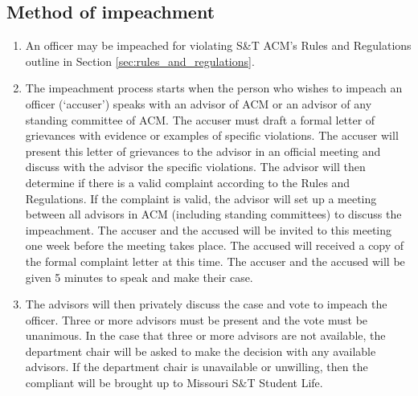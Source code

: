 \subsection{Method of impeachment}\label{sec:officers:impeachment}
\begin{enumerate}[label=\arabic*.]
  \item An officer may be impeached for violating S\&T ACM's Rules and
    Regulations outline in Section \ref{sec:rules_and_regulations}.
  \item The impeachment process starts when the person who wishes to impeach
    an officer (`accuser') speaks with an advisor of ACM or an advisor of
    any standing committee of ACM. The accuser must draft a formal letter of
    grievances with evidence or examples of specific violations. The accuser will
    present this letter of grievances to the advisor in an official meeting
    and discuss with the advisor the specific violations. The advisor will
    then determine if there is a valid complaint according to the Rules and
    Regulations. If the complaint is valid, the advisor will set up a
    meeting between all advisors in ACM (including standing committees) to
    discuss the impeachment. The accuser and the accused will be invited to
    this meeting one week before the meeting takes place. The accused will
    received a copy of the formal complaint letter at this time. The accuser and
    the accused will be given 5 minutes to speak and make their case.
  \item The advisors will then privately discuss the case and vote to impeach
    the officer. Three or more advisors must be present and the vote must be
    unanimous. In the case that three or more advisors are not available, the
    department chair will be asked to make the decision with any available
    advisors. If the department chair is unavailable or unwilling, then the
    compliant will be brought up to Missouri S\&T Student Life.
\end{enumerate}
